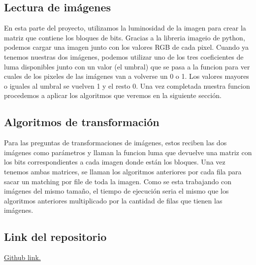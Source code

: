 \documentclass[12pt]{article}
\begin{document}
\subsection*{Lectura de imágenes}
 
\noindent En esta parte del proyecto, utilizamos la luminosidad de la imagen para crear la matriz que 
contiene los bloques de bits. Gracias a la libreria imageio de python, podemos cargar una imagen junto 
con los valores RGB de cada pixel. Cuando ya tenemos nuestras dos imágenes, podemos utilizar uno de los 
tres coeficientes de luma disponibles junto con un valor (el umbral) que se pasa a la funcion para ver cuales de los 
pixeles de las imágenes van a volverse un 0 o 1. Los valores mayores o iguales al umbral se vuelven 1 y el resto 0. 
Una vez completada nuestra funcion procedemos a aplicar los algoritmos que veremos en la siguiente sección.

\subsection*{Algoritmos de transformación}

\noindent Para las preguntas de transformaciones de imágenes, estos reciben las dos imágenes como 
parámetros y llaman la funcion luma que devuelve una matriz con los bits correspondientes a cada imagen 
donde están los bloques. Una vez tenemos ambas matrices, se llaman los algoritmos anteriores por cada fila 
para sacar un matching por file de toda la imagen. Como se esta trabajando con imágenes del mismo tamaño, 
el tiempo de ejecución seria el mismo que los algoritmos anteriores multiplicado por la cantidad de 
filas que tienen las imágenes.\\

\subsection*{}




\subsection*{Link del repositorio}
\noindent \href{https://www.github.com/DiegoELT/ADAProject}{Github link.}
\end{document}
